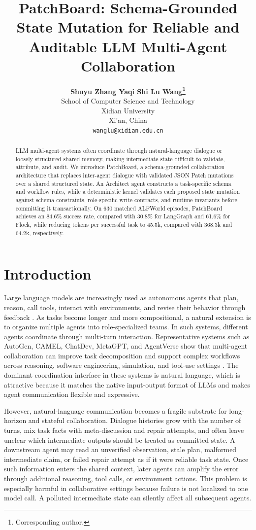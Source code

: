 \documentclass[11pt]{article}
\title{PatchBoard: Schema-Grounded State Mutation for Reliable and Auditable LLM Multi-Agent Collaboration}
\author{%
  \textbf{Shuyu Zhang \quad Yaqi Shi \quad Lu Wang\thanks{Corresponding author.} }\\
  School of Computer Science and Technology \\
  Xidian University \\
  Xi'an, China \\
  \texttt{wanglu@xidian.edu.cn}
}
\begin{document}
\maketitle

\begin{abstract}
LLM multi-agent systems often coordinate through natural-language dialogue or loosely structured shared memory, making intermediate state difficult to validate, attribute, and audit. We introduce PatchBoard, a schema-grounded collaboration architecture that replaces inter-agent dialogue with validated JSON Patch mutations over a shared structured state. An Architect agent constructs a task-specific schema and workflow rules, while a deterministic kernel validates each proposed state mutation against schema constraints, role-specific write contracts, and runtime invariants before committing it transactionally. On 630 matched ALFWorld episodes, PatchBoard achieves an 84.6\% success rate, compared with 30.8\% for LangGraph and 61.6\% for Flock, while reducing tokens per successful task to 45.5k, compared with 368.3k and 64.2k, respectively.
\end{abstract}

\section{Introduction}

Large language models are increasingly used as autonomous agents that plan, reason, call tools, interact with environments, and revise their behavior through feedback \citep{yao2023react,schick2023toolformer,shinn2023reflexion,yao2023tree,wang2023voyager}. As tasks become longer and more compositional, a natural extension is to organize multiple agents into role-specialized teams. In such systems, different agents coordinate through multi-turn interaction. Representative systems such as AutoGen, CAMEL, ChatDev, MetaGPT, and AgentVerse show that multi-agent collaboration can improve task decomposition and support complex workflows across reasoning, software engineering, simulation, and tool-use settings \citep{wu2024autogen,li2023camel,qian-etal-2024-chatdev,hong2024metagpt,chen2024agentverse,wang2024surveyagent}. The dominant coordination interface in these systems is natural language, which is attractive because it matches the native input-output format of LLMs and makes agent communication flexible and expressive.

However, natural-language communication becomes a fragile substrate for long-horizon and stateful collaboration. Dialogue histories grow with the number of turns, mix task facts with meta-discussion and repair attempts, and often leave unclear which intermediate outputs should be treated as committed state. A downstream agent may read an unverified observation, stale plan, malformed intermediate claim, or failed repair attempt as if it were reliable task state. Once such information enters the shared context, later agents can amplify the error through additional reasoning, tool calls, or environment actions. This problem is especially harmful in collaborative settings because failure is not localized to one model call. A polluted intermediate state can silently affect all subsequent agents.
\end{document}
